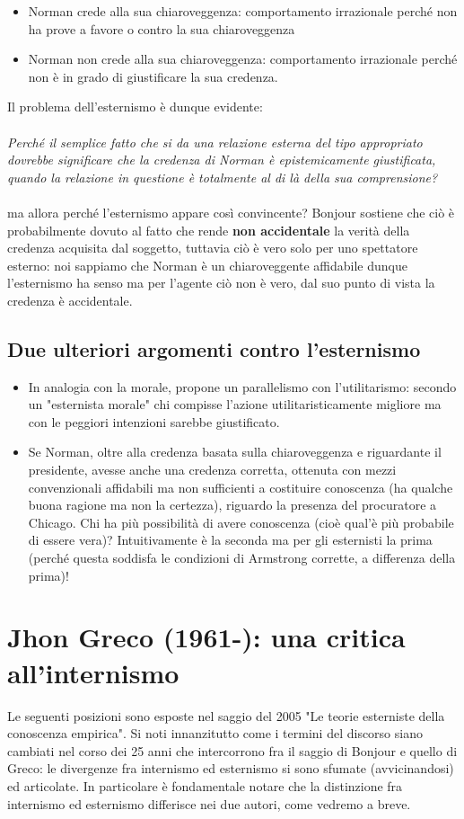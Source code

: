 \documentclass[10pt,a4paper]{article}
\begin{document}
\begin{itemize}
	\item Norman crede alla sua chiaroveggenza: comportamento irrazionale perché non ha prove a favore o contro la sua chiaroveggenza
	\item Norman non crede alla sua chiaroveggenza: comportamento irrazionale perché non è in grado di giustificare la sua credenza. 
\end{itemize}
Il problema dell'esternismo è dunque evidente:\\\\
\textit{Perché il semplice fatto che si da una relazione esterna del tipo appropriato dovrebbe significare che la credenza di Norman è epistemicamente giustificata, quando la relazione in questione è totalmente al di là della sua comprensione?}\\\\
ma allora perché l'esternismo appare così convincente? Bonjour sostiene che ciò è probabilmente dovuto al fatto che rende \textbf{non accidentale} la verità della credenza acquisita dal soggetto, tuttavia ciò è vero solo per uno spettatore esterno: noi sappiamo che Norman è un chiaroveggente affidabile dunque l'esternismo ha senso ma per l'agente ciò non è vero, dal suo punto di vista la credenza è accidentale.
\subsection{Due ulteriori argomenti contro l'esternismo}
\begin{itemize}
	\item In analogia con la morale, propone un parallelismo con l'utilitarismo: secondo un "esternista morale" chi compisse l'azione utilitaristicamente migliore ma con le peggiori intenzioni sarebbe giustificato.
	\item Se Norman, oltre alla credenza basata sulla chiaroveggenza e riguardante il presidente, avesse anche una credenza corretta, ottenuta con mezzi convenzionali affidabili ma non sufficienti a costituire conoscenza (ha qualche buona ragione ma non la certezza), riguardo la presenza del procuratore a Chicago. Chi ha più possibilità di avere conoscenza (cioè qual'è più probabile di essere vera)? Intuitivamente è la seconda ma per gli esternisti la prima (perché questa soddisfa le condizioni di Armstrong corrette, a differenza della prima)!
\end{itemize}

\newpage
\section{Jhon Greco (1961-): una critica all'internismo}
Le seguenti posizioni sono esposte nel saggio del 2005 "Le teorie esterniste della conoscenza empirica". Si noti innanzitutto come i termini del discorso  siano cambiati nel corso dei 25 anni che intercorrono fra il saggio di Bonjour e quello di Greco: le divergenze fra internismo ed esternismo si sono sfumate (avvicinandosi) ed articolate. In particolare è fondamentale notare che la distinzione fra internismo ed esternismo differisce nei due autori, come vedremo a breve. 
\end{document}
